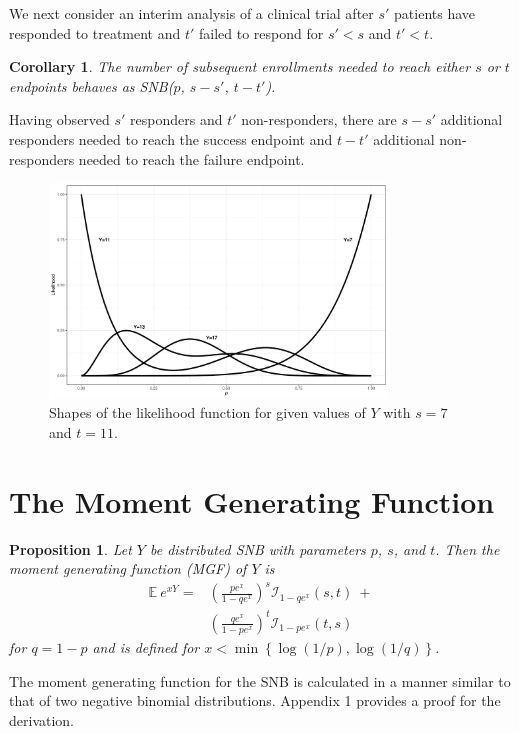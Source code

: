 \documentclass[sii]{ipart}
\newtheorem{prop}{Proposition}
\newtheorem{corollary}{Corollary}
\begin{document}
We next consider an interim analysis of a clinical trial after $s'$ 
patients have responded to treatment 
and $t'$ failed to respond for $s' < s$ and $t' < t$.
\begin{corollary} \label{conditional_distribution}
The number of subsequent enrollments needed 
to reach either $s$ or $t$ endpoints behaves as SNB($p$, $s-s'$, $t-t'$).
\end{corollary}
Having observed $s'$ responders and $t'$ non-responders, there are $s-s'$ 
additional responders needed to reach the success endpoint and $t-t'$ additional 
non-responders needed to reach the failure endpoint.

\begin{figure}
\begin{center}
\includegraphics[width=0.8\textwidth]{likelihood.pdf}
\end{center}
\caption{Shapes of the likelihood function for given values of $Y$ with 
$s=7$ and $t=11$.
\label{likelihood.fig}}
\end{figure}

\section{The Moment Generating Function} \label{sect:mgf}

\begin{prop} Let $Y$ be distributed SNB with parameters $p$, $s$, and $t$.
Then the moment generating function (MGF) of $Y$ is
\begin{align} \label{eqn:mgf}
\mathbb{E}~e^{xY} = &\left(\frac{p e^x}{1 - qe^x}\right)^s 
  \mathcal{I}_{1-qe^x} (s, t) \ + \nonumber \\
  & \left(\frac{qe^x}{1-pe^x}\right)^t \mathcal{I}_{1-pe^x}(t, s)
\end{align}
for $q = 1-p$ and is defined for 
$x < \min \left\{\log(1/p), \log(1/q) \right\}$.
\end{prop}
The moment generating function for the SNB is calculated in a manner similar to 
that of two negative binomial distributions. Appendix 1 provides a proof for the derivation.
\end{document}
